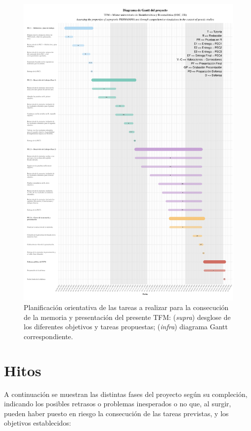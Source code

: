 \documentclass[IB,BIB]{TFUOC}%
\begin{document}
\begin{figure}[!htbp]
    \centering
    \includegraphics[scale=.45]{TFMGantt.pdf}
    \caption{\scriptsize{Planificación orientativa de las tareas a realizar para la consecución de la memoria y presentación del presente TFM: (\textit{supra}) desglose de los diferentes objetivos y tareas propuestas; (\textit{infra}) diagrama Gantt correspondiente.}}
    \label{fig:PEC1 - GANTT_TFM}
\end{figure}


\newpage


\section{Hitos}
\label{sec:PEC1 - Hitos}

A continuación se muestran las distintas fases del proyecto según su compleción, indicando los posibles retrasos o problemas inesperados o no que, al surgir, pueden haber puesto en riesgo la consecución de las tareas previstas, y los objetivos establecidos:
\end{document}
